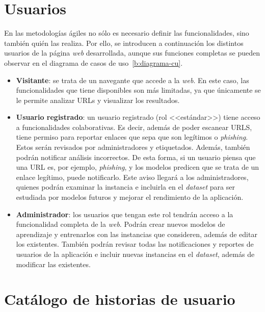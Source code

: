 \section{Usuarios}
\label{s:usuarios}

En las metodologías ágiles no sólo es necesario definir las funcionalidades, sino también quién las realiza. Por ello, se introducen a continuación los distintos usuarios de la página \textit{web} desarrollada, aunque sus funciones completas se pueden observar en el diagrama de casos de uso~\ref{b:diagrama-cu}.

\begin{itemize}
	\item \textbf{Visitante}: se trata de un navegante que accede a la \textit{web}. En este caso, las funcionalidades que tiene disponibles son más limitadas, ya que únicamente se le permite analizar URLs y visualizar los resultados.
	\item \textbf{Usuario registrado}: un usuario registrado (rol <<estándar>>) tiene acceso a funcionalidades colaborativas. Es decir, además de poder escanear URLS, tiene permiso para reportar enlaces que sepa que son legítimos o \textit{phishing}. Estos serán revisados por administradores y etiquetados. Además, también podrán notificar análisis incorrectos. De esta forma, si un usuario piensa que una URL es, por ejemplo, \textit{phishing}, y los modelos predicen que se trata de un enlace legítimo, puede notificarlo. Este aviso llegará a los administradores, quienes podrán examinar la instancia e incluirla en el \textit{dataset} para ser estudiada por modelos futuros y mejorar el rendimiento de la aplicación.
	\item \textbf{Administrador}: los usuarios que tengan este rol tendrán acceso a la funcionalidad completa de la \textit{web}. Podrán crear nuevos modelos de aprendizaje y entrenarlos con las instancias que consideren, además de editar los existentes. También podrán revisar todas las notificaciones y reportes de usuarios de la aplicación e incluir nuevas instancias en el \textit{dataset}, además de modificar las existentes.
\end{itemize}

\section{Catálogo de historias de usuario}
\label{s:hu}

